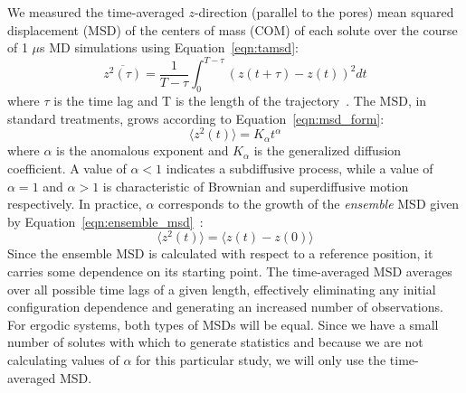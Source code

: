 \documentclass[journal=jpcbfk,manuscript=article]{achemso}
\begin{document}
  We measured the time-averaged $z$-direction (parallel to the pores) mean squared
  displacement (MSD) of the centers of mass (COM) of each solute over the course of 
  1 $\mu$s MD simulations using 
  Equation~\ref{eqn:tamsd}:
  \begin{equation}
	\overline{z^2(\tau)} = \dfrac{1}{T - \tau}\int_{0}^{T - \tau} (z(t + \tau) - z(t))^2 dt
	\label{eqn:tamsd}
  \end{equation}
  where $\tau$ is the time lag and T is the length of the trajectory~\cite{meroz_toolbox_2015}. 
  The MSD, in standard treatments, grows according to Equation~\ref{eqn:msd_form}:
  \begin{equation} 
	\langle z^2(t) \rangle = K_{\alpha}t^\alpha
	\label{eqn:msd_form}
  \end{equation} 
  where $\alpha$ is the anomalous exponent and $K_\alpha$ is the generalized diffusion 
  coefficient. A value of $\alpha < 1$ indicates a subdiffusive process, while a value 
  of $\alpha = 1$ and $\alpha > 1$ is characteristic of Brownian and superdiffusive
  motion respectively.
  In practice, $\alpha$ corresponds to the growth of the \textit{ensemble} MSD given
  by Equation~\ref{eqn:ensemble_msd}~\cite{meroz_toolbox_2015}:
  \begin{equation}
	\langle z^2(t) \rangle = \langle z(t) - z(0) \rangle
	\label{eqn:ensemble_msd}
  \end{equation}
  Since the ensemble MSD is calculated with respect to a reference position, it carries
  some dependence on its starting point. The time-averaged MSD averages over all possible
  time lags of a given length, effectively eliminating any initial configuration 
  dependence and generating	an increased number of observations. For ergodic systems, 
  both types of MSDs will be equal. Since we have a small number of solutes with which to
  generate statistics and because we are not calculating values of $\alpha$ for this 
  particular study,	we will only use the time-averaged MSD.
  
\end{document}

